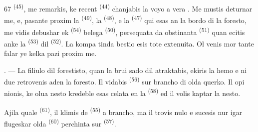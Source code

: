 \begin{VUpage}[69]{67}
\VUcontinue
{} \textsuperscript{(45)}, me remarkis, ke recent  \textsuperscript{(44)}\nl
chanjabis la voyo a vera . Me mustis\nl
deturnar me, e, pasante proxim la  \textsuperscript{(49)},\nl
la  \textsuperscript{(48)}, e la  \textsuperscript{(47)} qui esas an la bordo\nl
di la foresto, me vidis debushar ek  \textsuperscript{(54)}\nl
belega  \textsuperscript{(50)}, persequata da obstinanta\nl
{} \textsuperscript{(51)} quan ecitis anke la \cc
{} \textsuperscript{(53)} dil  \textsuperscript{(52)}. La kompa\cc
tinda bestio esis tote extenuita. Ol venis mor\cc
tante falar ye kelka pazi proxim me.

. --- La filiulo dil forestisto, quan la brui\cc
sado dil  atraktabis, ekiris la hemo\nl
e ni due retrovenis aden la foresto. Il vidabis\nl
{} \textsuperscript{(56)} sur brancho di olda querko. Il opi\cc
nionis, ke olua nesto kredeble esas celata en\nl
la  \textsuperscript{(58)} ed il volis kaptar la nesto.

\VUblancAlinea
Ajila quale  \textsuperscript{(61)}, il klimis de \cc
{} \textsuperscript{(55)} a brancho, ma il trovis nulo e sucesis\nl
nur igar flugeskar olda  \textsuperscript{(60)} perchinta\nl
sur  \textsuperscript{(57)}.

\VUsaut{4.0mm}
\VUfilet{22mm}
\end{VUpage}
